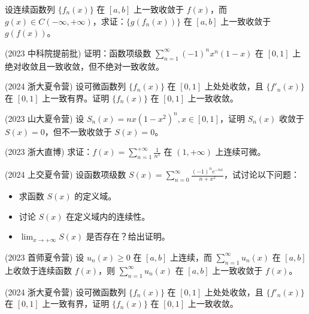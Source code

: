 \documentclass[lang=cn,10pt,thmcnt=section]{elegantbook}
\begin{document}
\begin{example}
设连续函数列 $\{f_n(x)\}$ 在 $[a,b]$ 上一致收敛于 $f(x)$，而 $g(x) \in C(-\infty, +\infty)$，求证：$\{g(f_n(x))\}$ 在 $[a,b]$ 上一致收敛于 $g(f(x))$。
\end{example}

\begin{example}
(2023 中科院提前批) 证明：函数项级数 $\sum_{n=1}^{\infty} (-1)^n x^n (1-x)$ 在 $[0,1]$ 上绝对收敛且一致收敛，但不绝对一致收敛。
\end{example}

\begin{example}
(2024 浙大夏令营) 设可微函数列 $\{f_n(x)\}$ 在 $[0,1]$ 上处处收敛，且 $\{f'_n(x)\}$ 在 $[0,1]$ 上一致有界。证明 $\{f_n(x)\}$ 在 $[0,1]$ 上一致收敛。
\end{example}

\begin{example}
(2023 山大夏令营) 设 $S_n(x) = nx(1-x^2)^n, x \in [0,1]$，证明 $S_n(x)$ 收敛于 $S(x) = 0$，但不一致收敛于 $S(x) = 0$。
\end{example}

\begin{example}
(2023 浙大直博) 求证：$f(x) = \sum_{n=1}^{+\infty} \frac{1}{n^x}$ 在 $(1, +\infty)$ 上连续可微。
\end{example}

\begin{example}
(2024 上交夏令营) 设函数项级数 $S(x) = \sum_{n=0}^{\infty} \frac{(-1)^n e^{-nx}}{n+x^2}$，试讨论以下问题：
\begin{itemize}
    \item 求函数 $S(x)$ 的定义域。
    \item 讨论 $S(x)$ 在定义域内的连续性。
    \item $\lim_{x \to +\infty} S(x)$ 是否存在？给出证明。
\end{itemize}
\end{example}

\begin{example}
(2023 首师夏令营) 设 $u_n(x) \geq 0$ 在 $[a,b]$ 上连续，而 $\sum_{n=1}^{\infty} u_n(x)$ 在 $[a,b]$ 上收敛于连续函数 $f(x)$，则 $\sum_{n=1}^{\infty} u_n(x)$ 在 $[a,b]$ 上一致收敛于 $f(x)$。
\end{example}

\begin{example}
(2024 浙大夏令营) 设可微函数列 $\{f_n(x)\}$ 在 $[0,1]$ 上处处收敛，且 $\{f'_n(x)\}$ 在 $[0,1]$ 上一致有界，证明 $\{f_n(x)\}$ 在 $[0,1]$ 上一致收敛。
\end{example}
\end{document}
